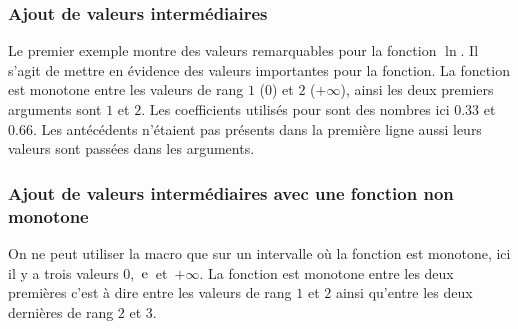 \subsubsection{Ajout de valeurs intermédiaires}

Le premier exemple montre des valeurs remarquables pour la fonction $\ln$. Il s'agit de mettre en évidence des valeurs importantes pour la fonction. La fonction est monotone  entre les valeurs de rang $1$ ($0$) et $2$ ($+\infty$), ainsi les deux premiers arguments sont $1$  et $2$. Les coefficients utilisés pour   sont des nombres  ici $0.33$ et $0.66$. Les antécédents n'étaient pas présents dans la première ligne aussi leurs valeurs sont passées dans les arguments.

\begin{tkzexample}
\end{tkzexample}

\begin{tkzexample}
\end{tkzexample}

\subsubsection{Ajout de valeurs intermédiaires avec une fonction non monotone }

On ne peut utiliser la macro que sur un intervalle où la fonction est monotone, ici il y a trois valeurs
\mbox{$0$, $\mathrm{e}$ et $+\infty$}. La fonction est monotone entre les deux premières c'est à dire entre  les valeurs de rang $1$ et $2$ ainsi qu'entre les deux dernières de rang $2$ et $3$.

\begin{tkzexample}
\end{tkzexample}

